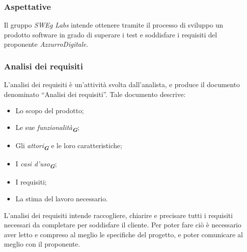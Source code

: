 \subsubsection{Aspettative}
Il gruppo \emph{SWEg Labs} intende ottenere tramite il processo di sviluppo un prodotto software in grado di superare i test e soddisfare i requisiti del proponente \emph{AzzurroDigitale}.

\subsubsection{Analisi dei requisiti}
\label{sec:analisi_dei_requisiti}

L’analisi dei requisiti è un’attività svolta dall’analista, e produce il documento denominato “Analisi dei requisiti”. 
Tale documento descrive:
\begin{itemize}
    \item Lo scopo del prodotto;
    \item Le sue \emph{funzionalità}\textsubscript{\textit{\textbf{G}}};
    \item Gli \emph{attori}\textsubscript{\textit{\textbf{G}}} e le loro caratteristiche;
    \item I \emph{casi d'uso}\textsubscript{\textit{\textbf{G}}};
    \item I requisiti;
    \item La stima del lavoro necessario.
\end{itemize}

L’analisi dei requisiti intende raccogliere, chiarire e precisare tutti i requisiti necessari da completare per soddisfare il cliente. Per poter fare ciò è necessario aver letto e compreso al meglio le specifiche del progetto, e poter comunicare al meglio con il proponente.

